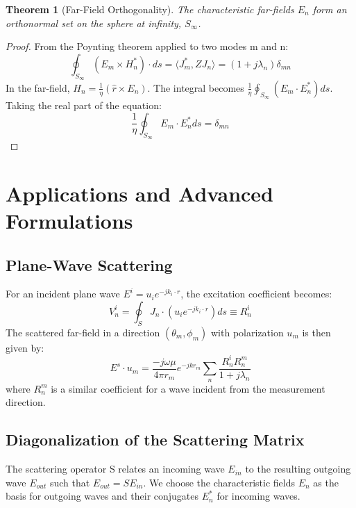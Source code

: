 \documentclass[11pt,a4paper]{article}
\newtheorem{theorem}{Theorem}[section]
\begin{document}
\begin{theorem}[Far-Field Orthogonality]
The characteristic far-fields \(E_{n}\) form an orthonormal set on the sphere at infinity, \(S_{\infty}\).
\end{theorem}
\begin{proof}
From the Poynting theorem applied to two modes m and n:
\begin{equation}
    \oint_{S_{\infty}}(E_{m}\times H_{n}^{*})\cdot ds=\langle J_{m}^{*},ZJ_{n}\rangle=(1+j\lambda_{n})\delta_{mn}
\end{equation}
In the far-field, \(H_{n}=\frac{1}{\eta}(\hat{r}\times E_{n})\). The integral becomes \(\frac{1}{\eta}\oint_{S_{\infty}}(E_{m}\cdot E_{n}^{*})ds\). Taking the real part of the equation:
\begin{equation}
    \frac{1}{\eta}\oint_{S_{\infty}}E_{m}\cdot E_{n}^{*}ds=\delta_{mn}
\end{equation}
\end{proof}

\section{Applications and Advanced Formulations}
\subsection{Plane-Wave Scattering}

For an incident plane wave \(E^{i}=u_{i}e^{-jk_{i}\cdot r}\), the excitation coefficient becomes:
\begin{equation}
    V_{n}^{i}=\oint_{S}J_{n}\cdot(u_{i}e^{-jk_{i}\cdot r})ds\equiv R_{n}^{i}
\end{equation}
The scattered far-field in a direction \((\theta_{m},\phi_{m})\) with polarization \(u_{m}\) is then given by:
\begin{equation}
    E^{s}\cdot u_{m}=\frac{-j\omega\mu}{4\pi r_{m}}e^{-jkr_{m}}\sum_{n}\frac{R_{n}^{i}R_{n}^{m}}{1+j\lambda_{n}}
\end{equation}
where \(R_{n}^{m}\) is a similar coefficient for a wave incident from the measurement direction.

\subsection{Diagonalization of the Scattering Matrix}

The scattering operator S relates an incoming wave \(E_{in}\) to the resulting outgoing wave \(E_{out}\) such that \(E_{out}=SE_{in}\). We choose the characteristic fields \(E_{n}\) as the basis for outgoing waves and their conjugates \(E_{n}^{*}\) for incoming waves.
\end{document}
